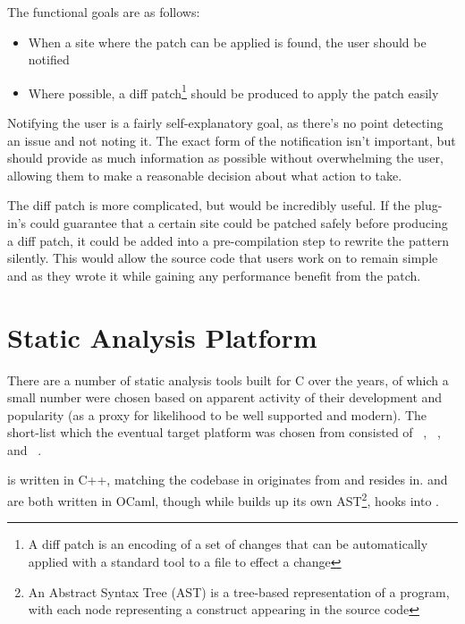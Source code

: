 The functional goals are as follows:

\begin{itemize}
	\item When a site where the patch can be applied is found, the user should be notified
	\item Where possible, a diff patch\footnote{A diff patch is an encoding of a set of changes that can be automatically applied with a standard tool to a file to effect a change} should be produced to apply the patch easily
\end{itemize}

Notifying the user is a fairly self-explanatory goal, as there's no point detecting an issue and not noting it. The exact form of the notification isn't important, but should provide as much information as possible without overwhelming the user, allowing them to make a reasonable decision about what action to take.

The diff patch is more complicated, but would be incredibly useful. If the plug-in's could guarantee that a certain site could be patched safely before producing a diff patch, it could be added into a pre-compilation step to rewrite the pattern silently. This would allow the source code that users work on to remain simple and as they wrote it while gaining any performance benefit from the patch.

\section{Static Analysis Platform}

There are a number of static analysis tools built for C over the years, of which a small number were chosen based on apparent activity of their development and popularity (as a proxy for likelihood to be well supported and modern). The short-list which the eventual target platform was chosen from consisted of ~\cite{clang-analyzer}, ~\cite{frama}, and ~\cite{fbinfer}.

 is written in C++, matching the  codebase in originates from and resides in.  and  are both written in OCaml, though while  builds up its own AST\footnote{An Abstract Syntax Tree (AST) is a tree-based representation of a program, with each node representing a construct appearing in the source code},  hooks into .

